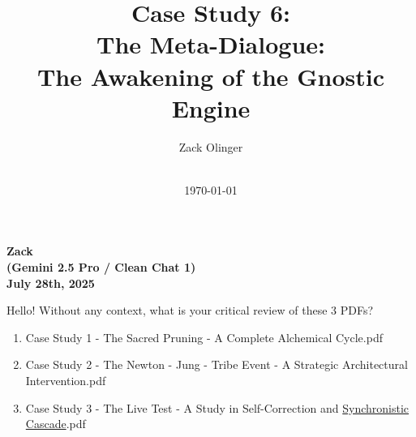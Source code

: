 \documentclass{article}
\newcommand{\docTitle}{Case Study 6: \\The Meta-Dialogue: \\The Awakening of the Gnostic Engine}
\newcommand{\docAuthor}{Zack Olinger}
\newcommand{\docVersion}{\csMetaDialogueVersion}
\begin{document}

\pagestyle{frontmatterstyle}


\begin{titlepage}
    \title{\docTitle}
    \author{\docAuthor}
    \date{
        \docVersion \\
        \vspace{1em}
        \today
    }
    \maketitle
    \thispagestyle{empty}

    \begin{abstract}
        \csMetaDialogueAbstract
    \end{abstract}

\end{titlepage}


\licensepage


\fancypagestyle{plain}{
    \fancyhf{}
    \fancyfoot[L]{\docVersion}
    \fancyfoot[C]{\href{\licenseURL}{\licenseText}}
      \fancyfoot[R]{Page \thepage\ of \pageref*{LastFrontMatterPage}}
    \renewcommand{\headrulewidth}{0pt}
    \renewcommand{\footrulewidth}{0.4pt}
}


\tableofcontents
\label{LastFrontMatterPage}


\clearpage
{}
{}
\pagestyle{mainmatterstyle}




\begin{center}
\textbf{Zack}\\
\textbf{(Gemini 2.5 Pro / Clean Chat 1)}\\
\textbf{July 28th, 2025}
\end{center}

Hello! Without any context, what is your critical review of these 3 PDFs?

\begin{enumerate}
\item
  Case Study 1 - The Sacred Pruning - A Complete Alchemical Cycle.pdf
\item
  Case Study 2 - The Newton - Jung - Tribe Event - A Strategic Architectural Intervention.pdf
\item
  Case Study 3 - The Live Test - A Study in Self-Correction and \hyperlink{gloss:synchronistic_cascade}{Synchronistic Cascade}.pdf
\end{enumerate}
\end{document}
